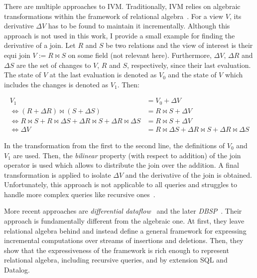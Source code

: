 There are multiple approaches to \ac{IVM}.
Traditionally, \ac{IVM} relies on algebraic transformations within the framework
of relational algebra~\cite{gupta1995maintenance, gupta1993maintaining, pgivm}.
For a view \(V\), its derivative \(\Delta V\) has to be found to maintain
it incrementally.
Although this approach is not used in this work, I provide a small example
for finding the derivative of a join.
Let \(R\) and \(S\) be two relations and the view of interest is their
equi join \(V := R \bowtie S\) on some field (not relevant here).
Furthermore, \(\Delta V\), \(\Delta R\) and \(\Delta S\) are the set of changes
to \(V\), \(R\) and \(S\), respectively, since their last evaluation.
The state of \(V\) at the last evaluation is denoted as \(V_0\) and the
state of \(V\) which includes the changes is denoted as \(V_1\). Then:

\begin{equation}
	\begin{aligned}
		V_1                                                                                               & = V_0 + \Delta V                                                      \\
		\Leftrightarrow (R + \Delta R) \bowtie (S + \Delta S)                                             & = R \bowtie S + \Delta V                                              \\
		\Leftrightarrow R \bowtie S + R \bowtie \Delta S + \Delta R \bowtie S + \Delta R \bowtie \Delta S & = R \bowtie S + \Delta V                                              \\
		\Leftrightarrow \Delta V                                                                          & = R \bowtie \Delta S + \Delta R \bowtie S + \Delta R \bowtie \Delta S
	\end{aligned}
\end{equation}

In the transformation from the first to the second line, the definitions
of \(V_0\) and \(V_1\) are used.
Then, the \emph{bilinear} property (with respect to addition) of the join
operator is used which allows to distribute the join over the addition.
A final transformation is applied to isolate \(\Delta V\) and the derivative
of the join is obtained.
Unfortunately, this approach is not applicable to all queries and struggles
to handle more complex queries like recursive ones~\cite{budiu2025dbsp}.

More recent approaches are \emph{differential dataflow}~\cite{mcsherry2013differential}
and the later \emph{DBSP}~\cite{budiu2022dbsp, budiu2024dbsp, budiu2025dbsp}.
Their approach is fundamentally different from the algebraic one.
At first, they leave relational algebra behind and instead define a general
framework for expressing incremental computations over streams of insertions
and deletions.
Then, they show that the expressiveness of the framework is rich enough to
represent relational algebra, including recursive queries, and by extension
SQL and Datalog.

